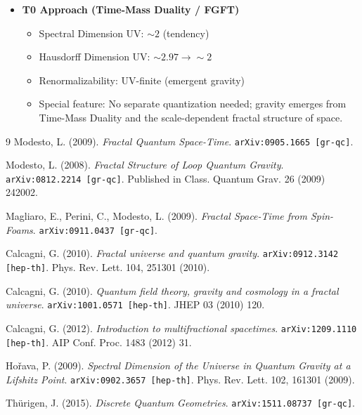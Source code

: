 \begin{itemize}
		\item \textbf{T0 Approach (Time-Mass Duality / FGFT)}
		\begin{itemize}
			\item Spectral Dimension UV: $\sim 2$ (tendency)
			\item Hausdorff Dimension UV: $\sim 2.97 \rightarrow \sim 2$
			\item Renormalizability: UV-finite (emergent gravity)
			\item Special feature: No separate quantization needed; gravity emerges from Time-Mass Duality and the scale-dependent fractal structure of space.
		\end{itemize}
	\end{itemize}
	\begin{thebibliography}{9}
	Modesto, L. (2009). \textit{Fractal Quantum Space-Time}. \texttt{arXiv:0905.1665 [gr-qc]}.
	
	Modesto, L. (2008). \textit{Fractal Structure of Loop Quantum Gravity}. \texttt{arXiv:0812.2214 [gr-qc]}. Published in Class. Quantum Grav. 26 (2009) 242002.
	
	Magliaro, E., Perini, C., Modesto, L. (2009). \textit{Fractal Space-Time from Spin-Foams}. \texttt{arXiv:0911.0437 [gr-qc]}.
	
	Calcagni, G. (2010). \textit{Fractal universe and quantum gravity}. \texttt{arXiv:0912.3142 [hep-th]}. Phys. Rev. Lett. 104, 251301 (2010).
	
	Calcagni, G. (2010). \textit{Quantum field theory, gravity and cosmology in a fractal universe}. \texttt{arXiv:1001.0571 [hep-th]}. JHEP 03 (2010) 120.
	
	Calcagni, G. (2012). \textit{Introduction to multifractional spacetimes}. \texttt{arXiv:1209.1110 [hep-th]}. AIP Conf. Proc. 1483 (2012) 31.
	
	Hořava, P. (2009). \textit{Spectral Dimension of the Universe in Quantum Gravity at a Lifshitz Point}. \texttt{arXiv:0902.3657 [hep-th]}. Phys. Rev. Lett. 102, 161301 (2009).
	
	Thürigen, J. (2015). \textit{Discrete Quantum Geometries}. \texttt{arXiv:1511.08737 [gr-qc]}.
\end{thebibliography}	